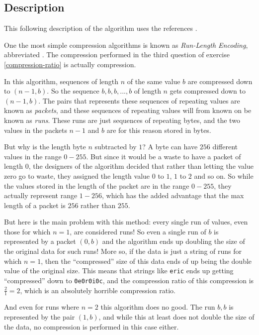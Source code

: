 \subsection{Description}

This following description of the \rle algorithm uses the references
\cite{nagarajan11:_enhan_approac_run_lengt_encod_schem,murray1996encyclopedia,mark1996data_compression_book}.

One the most simple compression algorithms is known as
\textit{Run-Length Encoding}, abbreviated \rle. The compression
performed in the third question of exercise \ref{compression-ratio} is
actually \rle compression.

In this algorithm, sequences of length $n$ of the same value $b$ are
compressed down to $(n-1,b)$. So the sequence $b,b,b,...,b$ of length
$n$ gets compressed down to $(n-1,b)$. The pairs that represents these
sequences of repeating values are known as \textit{packets}, and these
sequences of repeating values will from known on be known as
\textit{runs}. These runs are just sequences of repeating bytes, and
the two values in the packets $n-1$ and $b$ are for this reason stored
in bytes.

But why is the length byte $n$ subtracted by $1$?  A byte can have
$256$ different values in the range $0-255$. But since it would be a
waste to have a packet of length $0$, the designers of the algorithm
decided that rather than letting the value zero go to waste, they
assigned the length value $0$ to $1$, $1$ to $2$ and so on. So while
the values stored in the length of the packet are in the range
$0-255$, they actually represent range $1-256$, which has the added
advantage that the max length of a packet is $256$ rather than $255$.

But here is the main problem with this method: every single run of
values, even those for which $n=1$, are considered runs! So even a
single run of $b$ is represented by a packet $(0,b)$ and the algorithm
ends up doubling the size of the original data for such runs! More so,
if the data is just a string of runs for which $n=1$, then the
``compressed'' size of this data ends of up being the double value of
the original size. This means that strings like \texttt{eric} ends up
getting ``compressed'' down to \texttt{0e0r0i0c}, and the compression ratio
of this compression is $\frac{2}{1} = 2$, which is an absolutely
horrible compression ratio.

And even for runs where $n=2$ this algorithm does no good. The run
$b,b$ is represented by the pair $(1,b)$, and while this at least
does not double the size of the data, no compression is performed in
this case either.

